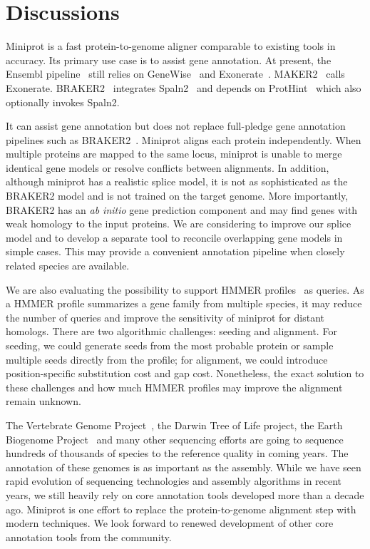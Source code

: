 \documentclass{bioinfo}
\begin{document}
\section{Discussions}

Miniprot is a fast protein-to-genome aligner comparable to existing tools in
accuracy. Its primary use case is to assist gene annotation. At present, the
Ensembl pipeline~\citep{Aken:2016wr} still relies on
GeneWise~\citep{Birney:2004uy} and Exonerate~\citep{Slater:2005aa}.
MAKER2~\citep{Cantarel:2008ue,Holt:2011tt} calls Exonerate.
BRAKER2~\citep{Bruna:2021ug} integrates Spaln2~\citep{Iwata:2012aa} and
depends on ProtHint~\citep{Bruna:2020vy} which also optionally invokes Spaln2.


It can assist gene annotation but does not replace full-pledge gene
annotation pipelines such as BRAKER2~\citep{Bruna:2021ug}.  Miniprot aligns
each protein independently. When multiple proteins are mapped to the same
locus, miniprot is unable to merge identical gene models or resolve conflicts
between alignments. In addition, although miniprot has a realistic splice
model, it is not as sophisticated as the BRAKER2 model and is not trained on
the target genome. More importantly, BRAKER2 has an \emph{ab initio} gene
prediction component and may find genes with weak homology to the input
proteins. We are considering to improve our splice model and to develop a
separate tool to reconcile overlapping gene models in simple cases. This may
provide a convenient annotation pipeline when closely related species are
available.

We are also evaluating the possibility to support HMMER
profiles~\citep{Eddy:2011tg} as queries. As a HMMER profile summarizes a gene
family from multiple species, it may reduce the number of queries and improve
the sensitivity of miniprot for distant homologs. There are two algorithmic
challenges: seeding and alignment.  For seeding, we could generate seeds from
the most probable protein or sample multiple seeds directly from the profile;
for alignment, we could introduce position-specific substitution cost and gap
cost. Nonetheless, the exact solution to these challenges and how much HMMER
profiles may improve the alignment remain unknown.

The Vertebrate Genome Project~\citep{Rhie:2021ug}, the Darwin Tree of Life
project, the Earth Biogenome Project~\citep{Lewin:2018ve} and many other sequencing efforts are
going to sequence hundreds of thousands of species to the reference quality in
coming years. The annotation of these genomes is as important as the assembly.
While we have seen rapid evolution of sequencing technologies and assembly
algorithms in recent years, we still heavily rely on core annotation tools
developed more than a decade ago. Miniprot is one effort to replace the
protein-to-genome alignment step with modern techniques. We look forward to
renewed development of other core annotation tools from the community.
\end{document}
